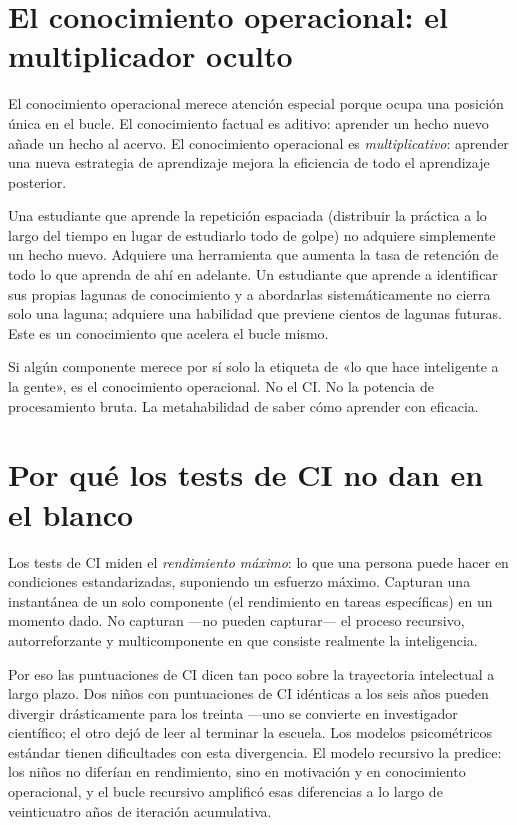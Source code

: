 \documentclass[11pt, twoside, openright]{book}
\begin{document}
\section*{El conocimiento operacional: el multiplicador oculto}

El conocimiento operacional merece atención especial porque ocupa una posición única en el bucle. El conocimiento factual es aditivo: aprender un hecho nuevo añade un hecho al acervo. El conocimiento operacional es \textit{multiplicativo}: aprender una nueva estrategia de aprendizaje mejora la eficiencia de todo el aprendizaje posterior.

Una estudiante que aprende la repetición espaciada (distribuir la práctica a lo largo del tiempo en lugar de estudiarlo todo de golpe) no adquiere simplemente un hecho nuevo. Adquiere una herramienta que aumenta la tasa de retención de todo lo que aprenda de ahí en adelante. Un estudiante que aprende a identificar sus propias lagunas de conocimiento y a abordarlas sistemáticamente no cierra solo una laguna; adquiere una habilidad que previene cientos de lagunas futuras. Este es un conocimiento que acelera el bucle mismo.

Si algún componente merece por sí solo la etiqueta de «lo que hace inteligente a la gente», es el conocimiento operacional. No el CI. No la potencia de procesamiento bruta. La metahabilidad de saber cómo aprender con eficacia.

\section*{Por qué los tests de CI no dan en el blanco}

Los tests de CI miden el \textit{rendimiento máximo}: lo que una persona puede hacer en condiciones estandarizadas, suponiendo un esfuerzo máximo. Capturan una instantánea de un solo componente (el rendimiento en tareas específicas) en un momento dado. No capturan ---no pueden capturar--- el proceso recursivo, autorreforzante y multicomponente en que consiste realmente la inteligencia.

Por eso las puntuaciones de CI dicen tan poco sobre la trayectoria intelectual a largo plazo. Dos niños con puntuaciones de CI idénticas a los seis años pueden divergir drásticamente para los treinta ---uno se convierte en investigador científico; el otro dejó de leer al terminar la escuela. Los modelos psicométricos estándar tienen dificultades con esta divergencia. El modelo recursivo la predice: los niños no diferían en rendimiento, sino en motivación y en conocimiento operacional, y el bucle recursivo amplificó esas diferencias a lo largo de veinticuatro años de iteración acumulativa.
\end{document}
